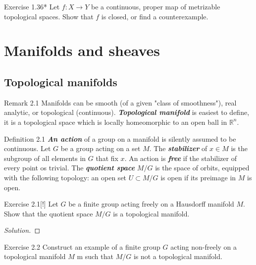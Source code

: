 \begin{thing4}{Exercise 1.36*}\label{exer:1.36}\leavevmode
Let $f:X \to Y$ be a continuous, proper map of metrizable topological spaces. Show that $f$ is closed, or find a counterexample.
\end{thing4}

\section{Manifolds and sheaves}

\subsection{Topological manifolds}

\begin{thing5}{Remark 2.1}\leavevmode
	Manifolds can be smooth (of a given "class of smoothness"), real analytic, or topological (continuous). \textit{\textbf{Topological manifold}} is easiest to define, it is a topological space which is locally homeomorphic to an open ball in $\mathbb{R}^n$.
\end{thing5}

\begin{thing3}{Definition 2.1}\leavevmode
	\textit{\textbf{An action}} of a group on a manifold is silently assumed to be continuous. Let $G$ be a group acting on a set $M$. The \textit{\textbf{stabilizer}} of $x \in M$ is the subgroup of all elements in $G$ that fix $x$. An action is \textit{\textbf{free}} if the stabilizer of every point os trivial. The \textit{\textbf{quotient space}} $M/G$ is the space of orbits, equipped with the following topology: an open set $U \subset M/G $ is open if its preimage in $M$ is open.
\end{thing3}

\begin{thing4}{Exercise 2.1}[!]\label{exer:2.1}\leavevmode
Let $G$ be a finite group acting freely on a Hausdorff manifold $M$. Show that the quotient space $M/G$ is a topological manifold.
\end{thing4}

\begin{proof}[Solution]\leavevmode

\end{proof}

\begin{thing4}{Exercise 2.2}\label{exer:2.2}\leavevmode
Construct an example of a finite group $G$ acting non-freely on a topological manifold $M$ m such that $M/G$ is not a topological manifold.
\end{thing4}

